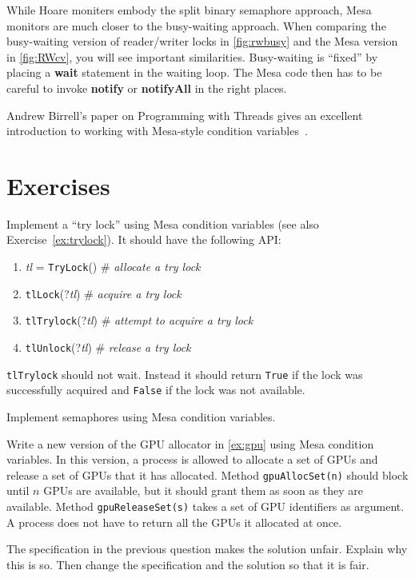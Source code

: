 \documentclass{report}
\begin{document}
While Hoare moniters embody the split binary semaphore approach,
Mesa monitors are much closer to the busy-waiting approach.
When comparing the busy-waiting version of reader/writer locks in \autoref{fig:rwbusy}
and the Mesa version in \autoref{fig:RWcv}, you will see important similarities.
Busy-waiting is ``fixed'' by placing a \textbf{wait} statement in the waiting loop.
The Mesa code then has to be careful to invoke \textbf{notify} or \textbf{notifyAll}
in the right places.

Andrew Birrell's paper on Programming with Threads gives an excellent
introduction to working with Mesa-style condition variables~\cite{Birrell89}.

\section*{Exercises}
\begin{problems}
\item Implement a ``try lock'' using Mesa condition variables
(see also Exercise~\ref{ex:trylock}).  It should
have the following API:
\begin{enumerate}
\item \textit{tl} = \texttt{TryLock}() \# \emph{allocate a try lock}
\item \texttt{tlLock}(?\textit{tl}) \# \emph{acquire a try lock}
\item \texttt{tlTrylock}(?\textit{tl}) \# \emph{attempt to acquire a try lock}
\item \texttt{tlUnlock}(?\textit{tl}) \# \emph{release a try lock}
\end{enumerate}
\noindent
\texttt{tlTrylock} should not wait.
Instead it should return \texttt{True} if the lock was successfully
acquired and \texttt{False} if the lock was not available.
\item Implement semaphores using Mesa condition variables.
\item Write a new version of the GPU allocator in \autoref{ex:gpu}
using Mesa condition variables.
In this version,
a process is allowed to allocate a set of GPUs and release a set of GPUs that it
has allocated.  Method \texttt{gpuAllocSet(n)} should block until $n$ GPUs are
available, but it should grant them as soon as they are available.
Method \texttt{gpuReleaseSet(s)} takes a set of GPU identifiers as argument.
A process does not have to return all the GPUs it allocated at once.
\item The specification in the previous question makes the solution unfair.
Explain why this is so.  Then change the specification and the solution so that
it is fair.
\end{problems}
\end{document}

